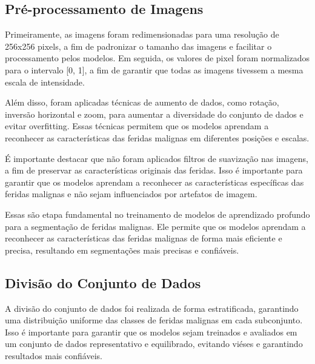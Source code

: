 \subsection{Pré-processamento de Imagens}
    Primeiramente, as imagens foram redimensionadas para uma resolução de 256x256 pixels, a fim de padronizar o tamanho das imagens e facilitar o processamento pelos modelos. Em seguida, os valores de pixel foram normalizados para o intervalo [0, 1], a fim de garantir que todas as imagens tivessem a mesma escala de intensidade. 
    
    Além disso, foram aplicadas técnicas de aumento de dados, como rotação, inversão horizontal e zoom, para aumentar a diversidade do conjunto de dados e evitar overfitting. Essas técnicas permitem que os modelos aprendam a reconhecer as características das feridas malignas em diferentes posições e escalas.
    
    É importante destacar que não foram aplicados filtros de suavização nas imagens, a fim de preservar as características originais das feridas. Isso é importante para garantir que os modelos aprendam a reconhecer as características específicas das feridas malignas e não sejam influenciados por artefatos de imagem.
    
    Essas são etapa fundamental no treinamento de modelos de aprendizado profundo para a segmentação de feridas malignas. Ele permite que os modelos aprendam a reconhecer as características das feridas malignas de forma mais eficiente e precisa, resultando em segmentações mais precisas e confiáveis.

\subsection{Divisão do Conjunto de Dados}

    A divisão do conjunto de dados foi realizada de forma estratificada, garantindo uma distribuição uniforme das classes de feridas malignas em cada subconjunto. Isso é importante para garantir que os modelos sejam treinados e avaliados em um conjunto de dados representativo e equilibrado, evitando viéses e garantindo resultados mais confiáveis.


